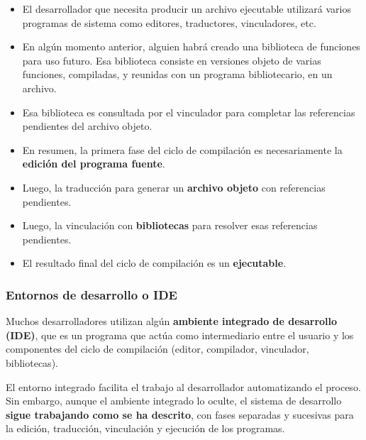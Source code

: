 \documentclass[spanish,A4,]{article}
\begin{document}
\begin{itemize}
\item
  El desarrollador que necesita producir un archivo ejecutable utilizará
  varios programas de sistema como editores, traductores, vinculadores,
  etc.
\item
  En algún momento anterior, alguien habrá creado una biblioteca de
  funciones para uso futuro. Esa biblioteca consiste en versiones objeto
  de varias funciones, compiladas, y reunidas con un programa
  bibliotecario, en un archivo.
\item
  Esa biblioteca es consultada por el vinculador para completar las
  referencias pendientes del archivo objeto.
\item
  En resumen, la primera fase del ciclo de compilación es necesariamente
  la \textbf{edición del programa fuente}.
\item
  Luego, la traducción para generar un \textbf{archivo objeto} con
  referencias pendientes.
\item
  Luego, la vinculación con \textbf{bibliotecas} para resolver esas
  referencias pendientes.
\item
  El resultado final del ciclo de compilación es un \textbf{ejecutable}.
\end{itemize}

\subsubsection{Entornos de desarrollo o
IDE}\label{entornos-de-desarrollo-o-ide}

Muchos desarrolladores utilizan algún \textbf{ambiente integrado de
desarrollo (IDE)}, que es un programa que actúa como intermediario entre
el usuario y los componentes del ciclo de compilación (editor,
compilador, vinculador, bibliotecas).

El entorno integrado facilita el trabajo al desarrollador automatizando
el proceso. Sin embargo, aunque el ambiente integrado lo oculte, el
sistema de desarrollo \textbf{sigue trabajando como se ha descrito}, con
fases separadas y sucesivas para la edición, traducción, vinculación y
ejecución de los programas.
\end{document}
